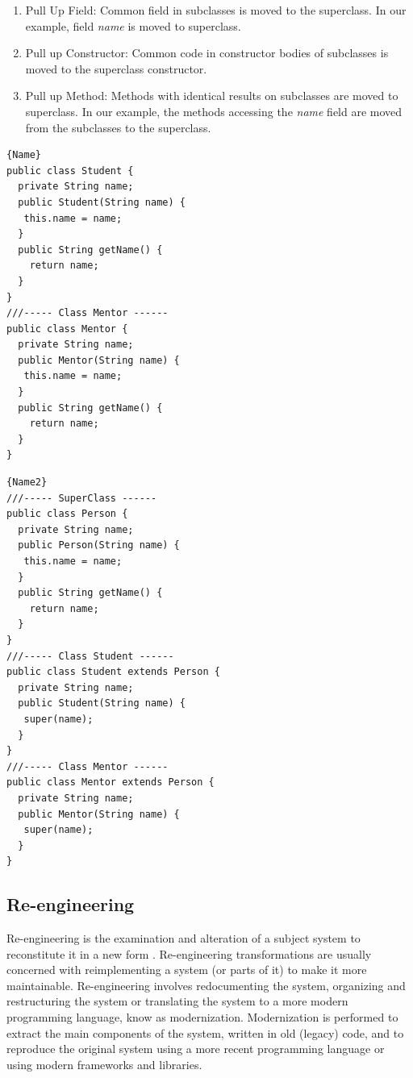 \begin{enumerate}
\item Pull Up Field: Common field in subclasses is moved to the superclass. In our example, field \textit{name} is moved to superclass. 
\item Pull up Constructor: Common code in constructor bodies of subclasses is moved to the superclass constructor. 
\item Pull up Method: Methods with identical results on subclasses are moved to superclass. In our example, the methods accessing the \textit{name} field are moved from the subclasses to the superclass. 
\end{enumerate}


\noindent\begin{minipage}{.45\textwidth}
\begin{lstlisting}[style=java,caption=Before refactorings,label=lst:refactoring]{Name}
public class Student {
  private String name;
  public Student(String name) {
   this.name = name;
  }
  public String getName() {
	return name;
  }
}
///----- Class Mentor ------
public class Mentor {
  private String name;
  public Mentor(String name) {
   this.name = name;
  }
  public String getName() {
	return name;
  }
}
\end{lstlisting}
\end{minipage}\hfill
\begin{minipage}{.45\textwidth}
\begin{lstlisting}[style=java,caption=After refactorings,label=lst:refactoring2]{Name2}
///----- SuperClass ------
public class Person {
  private String name;
  public Person(String name) {
   this.name = name;
  }
  public String getName() {
	return name;
  }
}
///----- Class Student ------
public class Student extends Person {
  private String name;
  public Student(String name) {
   super(name);
  }
}
///----- Class Mentor ------
public class Mentor extends Person {
  private String name;
  public Mentor(String name) {
   super(name);
  }
}
\end{lstlisting}
\end{minipage}

\subsection{Re-engineering}

Re-engineering is the examination and alteration of a subject system to reconstitute it in a new form \cite{Chikofsky}. 
Re-engineering transformations are usually concerned with reimplementing a system (or parts of it) to make it more maintainable. Re-engineering involves redocumenting the system, organizing and restructuring the system or translating the system to a more modern programming language, know as modernization. Modernization is performed to extract the main components of the system, written in old (legacy) code, and to reproduce the original system using a more recent programming language or using modern frameworks and libraries.

